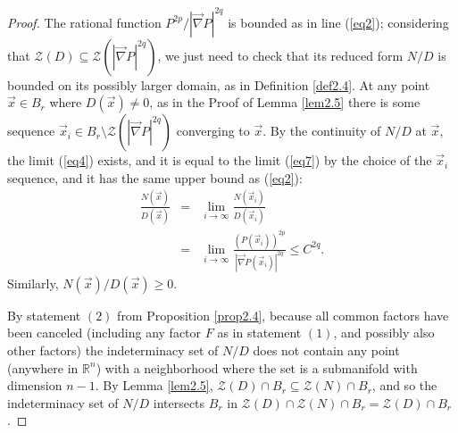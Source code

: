 \documentclass[12pt]{amsart}
\theoremstyle{definition}
\theoremstyle{remark}
\numberwithin{equation}{section}
\newcommand{\re}{\mathbb{R}}
\newcommand{\vv}{\mathcal{Z}}
\begin{document}
\begin{proof}
  The rational function $P^{2p}/|\vec\nabla P|^{2q}$ is bounded as in line (\ref{eq2}); considering that $\vv(D)\subseteq\vv(|\vec\nabla P|^{2q})$, we just need to check that its reduced form $N/D$ is bounded on its possibly larger domain, as in Definition \ref{def2.4}.  At any point $\vec x\in B_r$ where $D(\vec x)\ne0$, as in the Proof of Lemma \ref{lem2.5} there is some sequence $\vec x_i\in B_r\setminus\vv(|\vec\nabla P|^{2q})$ converging to $\vec x$.   By the continuity of $N/D$ at $\vec x$, the limit (\ref{eq4}) exists, and it is equal to the limit (\ref{eq7}) by the choice of the $\vec x_i$ sequence, and it has the same upper bound as (\ref{eq2}):
\begin{eqnarray}
  \frac{N(\vec x)}{D(\vec x)}&=&\lim_{i\to\infty}\frac{N(\vec x_i)}{D(\vec x_i)}\label{eq4}\\
  &=&\lim_{i\to\infty}\frac{(P(\vec x_i))^{2p}}{\left|\vec\nabla P(\vec x_i)\right|^{2q}}\le C^{2q}.\label{eq7}
\end{eqnarray}
Similarly, $N(\vec x)/D(\vec x)\ge0$.

By statement $(2)$ from Proposition \ref{prop2.4}, because all common factors have been canceled (including any factor $F$ as in statement $(1)$, and possibly also other factors) the indeterminacy set of $N/D$ does not contain any point (anywhere in $\re^n$) with a neighborhood where the set is a submanifold with dimension $n-1$.  By Lemma \ref{lem2.5}, $\vv(D)\cap B_r\subseteq\vv(N)\cap B_r$, and so the indeterminacy set of $N/D$ intersects $B_r$ in $\vv(D)\cap\vv(N)\cap B_r=\vv(D)\cap B_r$.
 
\end{proof}

\end{document}
